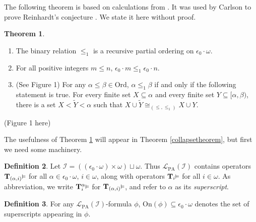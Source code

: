 \documentclass[reqno]{article}
\theoremstyle{definition}
\newtheorem{theorem}{Theorem}
\newtheorem{definition}[theorem]{Definition}
\def\L{\mathscr{L}}
\def\T{\mathbf{T}}
\def\LPA{\L_{\mathrm{PA}}}
\def\epom{\epsilon_0\cdot\omega}
\def\indset{\mathcal I}
\def\onset{\mathrm{On}}
\renewcommand{\Pr}[1]{\T_{#1}\mbox{\small${\vDash}$}}
\newcommand{\Prr}[2]{\T^{#1}_{#2}\mbox{\small${\vDash}$}}
\begin{document}
The following theorem is based on calculations from \cite{carlson1999}.
It was used by Carlson to prove Reinhardt's conjecture \cite{carlson2000}.
We state it here without proof.


\begin{theorem}
\label{blackbox}
\item
\begin{enumerate}
\item The binary relation $\leq_1$ is a recursive partial ordering on $\epom$.
\item For all positive integers $m\leq n$, $\epsilon_0\cdot m\leq_1\epsilon_0\cdot n$.
\item (See Figure 1) For any $\alpha\leq\beta\in\mathrm{Ord}$, $\alpha\leq_1\beta$ if and only if
the following statement is true.  For every finite set $X\subseteq\alpha$
and every finite set $Y\subseteq[\alpha,\beta)$, there is a set
$X<\widetilde Y<\alpha$ such that $X\cup\widetilde Y\cong_{(\leq,\leq_1)}X\cup Y$.
\end{enumerate}
\end{theorem}


%
%




(Figure 1 here)

The usefulness of Theorem \ref{blackbox} will appear
in Theorem \ref{collapsetheorem}, but first we need some machinery.


\begin{definition}
Let $\indset=((\epom)\times\omega)\sqcup\omega$.
Thus $\LPA(\indset)$ contains operators $\Pr{(\alpha,i)}$ for all $\alpha\in\epom$, $i\in\omega$,
along with operators $\Pr{i}$ for all $i\in\omega$.
As abbreviation,
we write $\Prr{\alpha}{i}$ for $\Pr{(\alpha,i)}$,
and refer to $\alpha$ as its \emph{superscript}.
\end{definition}

\begin{definition}
For any $\LPA(\indset)$-formula $\phi$, $\onset(\phi)\subseteq\epom$ denotes
the set of superscripts appearing in $\phi$.
\end{definition}
\end{document}

